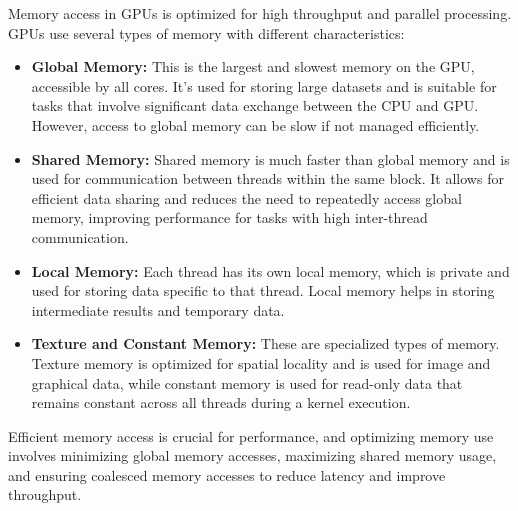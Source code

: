 Memory access in GPUs is optimized for high throughput and parallel processing. GPUs use several types of memory with different characteristics:
\begin{itemize}
    \item \textbf{Global Memory:} This is the largest and slowest memory on the GPU, accessible by all cores. It's used for storing large datasets and is suitable for tasks that involve significant data exchange between the CPU and GPU. However, access to global memory can be slow if not managed efficiently.
    \item \textbf{Shared Memory:} Shared memory is much faster than global memory and is used for communication between threads within the same block. It allows for efficient data sharing and reduces the need to repeatedly access global memory, improving performance for tasks with high inter-thread communication.
    \item \textbf{Local Memory:} Each thread has its own local memory, which is private and used for storing data specific to that thread. Local memory helps in storing intermediate results and temporary data.
    \item \textbf{Texture and Constant Memory:} These are specialized types of memory. Texture memory is optimized for spatial locality and is used for image and graphical data, while constant memory is used for read-only data that remains constant across all threads during a kernel execution.
\end{itemize}
    Efficient memory access is crucial for performance, and optimizing memory use involves minimizing global memory accesses, maximizing shared memory usage, and ensuring coalesced memory accesses to reduce latency and improve throughput.